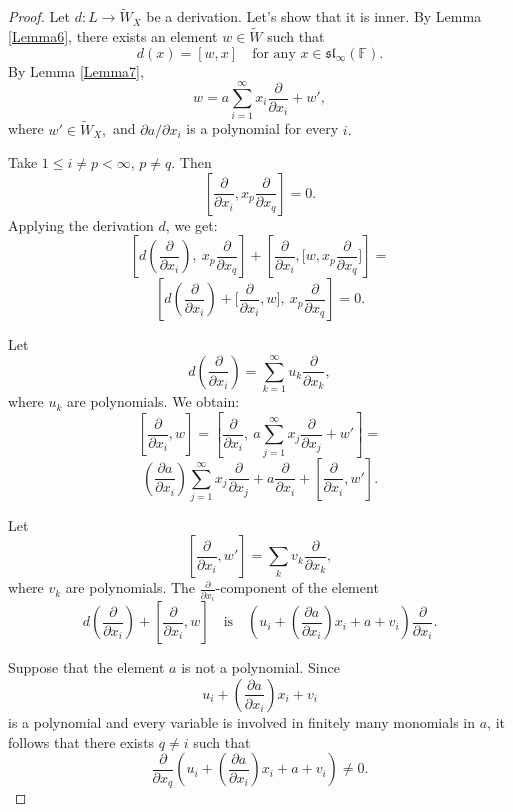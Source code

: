 \documentclass[10pt,a4paper]{amsart}
\begin{document}
	\begin{proof} Let \( d : L \to \widetilde{W}_X \) be a derivation. Let's show that it is inner. By Lemma \ref{Lemma6}, there exists an element \( w \in \widetilde{W} \) such that
		\[
		d(x) = [w, x] \quad \text{for any } x \in \mathfrak{sl}_\infty(\mathbb{F}).
		\] By Lemma \ref{Lemma7}, $$ w = a \sum_{i=1}^\infty x_i \frac{\partial}{\partial x_i} + w',$$ where $ w' \in \widetilde{W}_X , $ and  $\partial a / {\partial x_i}$ is a polynomial for every  $i. $
		
		
		Take \( 1 \leq i \not= p < \infty \), $p\not= q.$ Then
		\[
		\left[ \frac{\partial}{\partial x_i}, x_p \frac{\partial}{\partial x_q} \right] = 0.
		\] Applying the derivation \( d \), we get:
		\[
		\left[ d\left( \frac{\partial}{\partial x_i}\right), \ x_p \frac{\partial}{\partial x_q} \right]
		+ \left[ \frac{\partial}{\partial x_i}, \Big[w, x_p \frac{\partial}{\partial x_q}\Big] \right]
		= \] \[\left[ d\left( \frac{\partial}{\partial x_i} \right) + \Big[\frac{\partial}{\partial x_i}, w\Big], \  x_p \frac{\partial}{\partial x_q} \right] = 0.
		\]
		
		Let
		\[
		d\left( \frac{\partial}{\partial x_i} \right) = \sum_{k=1}^\infty u_k \frac{\partial}{\partial x_k},\] where  $ u_k$  are polynomials.  We obtain: 
		\[
		\left[ \frac{\partial}{\partial x_i}, w \right] = \left[ \frac{\partial}{\partial x_i}, \ a\sum_{j=1}^\infty x_j \frac{\partial}{\partial x_j} +   w' \right]=
		\]
		\[ \left( \frac{\partial a}{\partial x_i}\right)  \sum_{j=1}^\infty x_j \frac{\partial}{\partial x_j} + a  \frac{\partial }{\partial x_i} + \left[ \frac{\partial}{\partial x_i}, w' \right].  \]
		
		
		Let
		\[
		\left[ \frac{\partial}{\partial x_i}, w' \right] = \sum_k v_k \frac{\partial}{\partial x_k}, \] where   $v_k$ are polynomials. The \( \frac{\partial}{\partial x_i} \)-component of the element \[   d\left(\frac{\partial}{\partial x_i}\right) +\left[  \frac{\partial}{\partial x_i}, w\right] \quad \text{is} \quad 
		\left(u_i + \left(\frac{\partial a}{\partial x_i}\right) x_i + a + v_i\right) \frac{\partial}{\partial x_i}.
		\]
		
		
		Suppose that the element $a$ is not a polynomial. Since \[  u_i + \left(\frac{\partial a}{\partial x_i} \right)x_i + v_i \] is a polynomial and every variable is involved in finitely many monomials in \( a \), it follows that there exists \( q \neq i \) such that
		\[
		\frac{\partial}{\partial x_q}\left(u_i + \left(\frac{\partial a}{\partial x_i}\right) x_i + a + v_i\right) \neq 0.
		\]
		

\end{proof}
\end{document}
